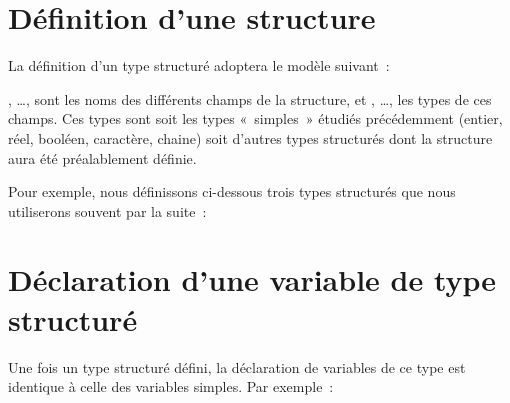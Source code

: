 \section{Définition d’une structure}

	La définition d’un type structuré adoptera le modèle suivant~:


	, \dots,  
	sont les noms des différents champs de la structure, 
	et , \dots,  
	les types de ces champs. 
	Ces types sont soit les types «~simples~» étudiés
	précédemment (entier, réel, booléen, caractère, chaine) soit d’autres
	types structurés dont la structure aura été préalablement définie.

	Pour exemple, nous définissons ci-dessous trois
	types structurés que nous utiliserons souvent par la suite~:




\section{Déclaration d’une variable de type structuré}

	Une fois un type structuré défini, la
	déclaration de variables de ce type est identique à celle des variables
	simples. Par exemple~:

